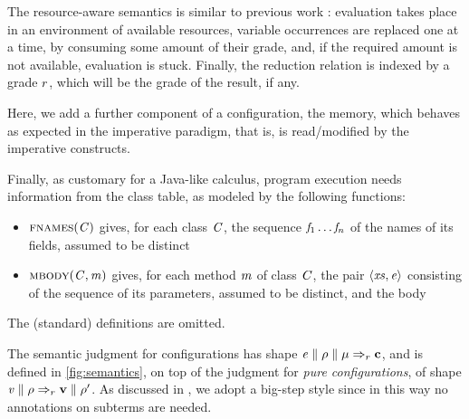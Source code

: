 The resource-aware semantics is similar to  previous work \cite{ChoudhuryEEW21,BianchiniDGZ23ecoop,BianchiniDGZ23oopsla}: evaluation takes place in an environment of available resources, variable occurrences are replaced one at a time, by consuming some amount of their grade, and, if the required amount is not available, evaluation is stuck. Finally, the reduction relation is indexed by a grade $r$, which will be the grade of the result, if any. 

Here, we add a further component of a configuration, the memory, which behaves as expected in the imperative paradigm, that is, is read/modified by the imperative constructs. 

Finally, as customary for a Java-like calculus, program execution needs information from the class table, as modeled by the following functions:
\begin{itemize}
\item $\textsc{fnames}(\mathit{C})$ gives, for each class $\mathit{C}$, the sequence $\mathit{f}_1\ldots\mathit{f}_n$ of the names of its fields,  assumed to be distinct
\item $\textsc{mbody}(\mathit{C},\mathit{m})$ gives, for each method $\mathit{m}$ of class $\mathit{C}$, the pair $\langle {\mathit{xs}},{\mathit{e}} \rangle$ consisting of the sequence of its parameters, assumed to be distinct, and the body
\end{itemize}
The (standard) definitions are omitted.

The
semantic judgment for configurations has shape $\mathit{e}\parallel\rho\parallel\mu\Rightarrow_{r}\mathbf{c}$, and is defined in \cref{fig:semantics}, on top of the judgment  for \emph{pure configurations}, of shape 
$\mathit{v}\parallel\rho\Rightarrow_{r}\mathbf{v}\parallel\rho'$. As discussed in \cite{BianchiniDGZ23oopsla}, we adopt a big-step style since in this way no annotations on subterms are needed. 

